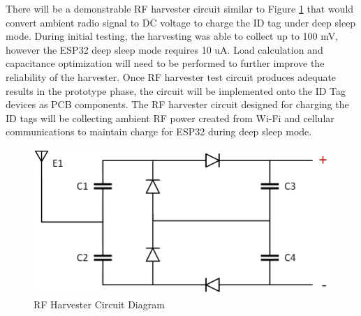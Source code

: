 There will be a demonstrable RF harvester circuit similar to Figure \ref{rf_c} that would convert ambient radio signal to DC voltage to charge the ID tag under deep sleep mode. During initial testing, the harvesting was able to collect up to 100 mV, however the ESP32 deep sleep mode requires 10 uA. Load calculation and capacitance optimization will need to be performed to further improve the reliability of the harvester. Once RF harvester test circuit produces adequate results in the prototype phase, the circuit will be implemented onto the ID Tag devices as PCB components. The RF harvester circuit designed for charging the ID tags will be collecting ambient RF power created from Wi-Fi and cellular communications to maintain charge for ESP32 during deep sleep mode.

\medskip
\begin{figure}[H]
\centering
    \includegraphics[scale=0.5]{./images/rf_circuit.png}
    \caption{RF Harvester Circuit Diagram}
    \label{rf_c}
\end{figure}



\pagebreak
